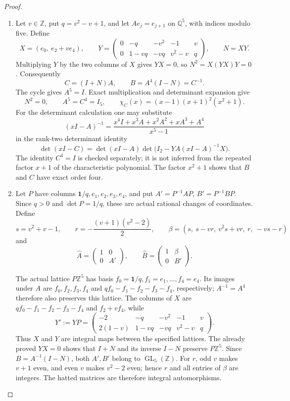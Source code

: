 \documentclass[11pt,a4paper]{article}
\theoremstyle{definition}
\begin{document}
\begin{proof}
\begin{enumerate}[label=\arabic*.]
\item Let $v\in\mathbb Z$, put $q=v^2-v+1$, and let
$Ae_j=e_{j+1}$ on $\mathbb Q^5$, with indices modulo five. Define
\[
 X=(e_0,\ e_2+ve_4),\qquad
 Y=\begin{pmatrix}
 0&-q&-v^2&-1&v\\
 0&1-vq&-vq&v^2-v&q
 \end{pmatrix},\qquad N=XY.
 \tag{F.U1}\label{maps:eq:F.U1}
\]
Multiplying $Y$ by the two columns of $X$ gives $YX=0$, so
$N^2=X(YX)Y=0$. Consequently
\[
 C=(I+N)A,\qquad B=A^4(I-N)=C^{-1}.
\]
The cycle gives $A^5=I$. Exact multiplication and determinant
expansion give
\[
 N^2=0,\qquad A^5=C^4=I_5,\qquad
 \chi_C(x)=(x-1)(x+1)^2(x^2+1).
 \tag{F.U2}\label{maps:eq:F.U2}
\]
For the determinant calculation one may substitute
\[
 (xI-A)^{-1}=
 \frac{x^4I+x^3A+x^2A^2+xA^3+A^4}{x^5-1}
\]
in the rank-two determinant identity
\[
 \det(xI-C)=\det(xI-A)
       \det\bigl(I_2-YA(xI-A)^{-1}X\bigr).
\]
The identity $C^4=I$ is checked separately; it is not inferred
from the repeated factor $x+1$ of the characteristic polynomial.
The factor $x^2+1$ shows that $B$ and $C$ have exact order four.

\item Let $P$ have columns $\mathbf1/q,e_1,e_2,e_3,e_4$, and put
$A'=P^{-1}AP$, $B'=P^{-1}BP$. Since $q>0$ and $\det P=1/q$,
these are actual rational changes of coordinates. Define
\[
 s=v^2+v-1,\qquad r=-\frac{(v+1)(v^2-2)}2,
 \qquad
 \beta=(s,\ s-vr,\ v^2s+vr,\ r,\ -vs-r)
 \tag{F.U3}\label{maps:eq:F.U3}
\]
and
\[
 \widehat A=\begin{pmatrix}1&0\\0&A'\end{pmatrix},\qquad
 \widehat B=\begin{pmatrix}1&\beta\\0&B'\end{pmatrix}.
 \tag{F.U4}\label{maps:eq:F.U4}
\]

The actual lattice $P\mathbb Z^5$ has basis
$f_0=\mathbf1/q,f_1=e_1,\ldots,f_4=e_4$.
Its images under $A$ are $f_0,f_2,f_3,f_4$ and
$qf_0-f_1-f_2-f_3-f_4$, respectively; $A^{-1}=A^4$
therefore also preserves this lattice. The columns of $X$ are
$qf_0-f_1-f_2-f_3-f_4$ and $f_2+vf_4$, while
\[
 Y':=YP=\begin{pmatrix}
 -2&-q&-v^2&-1&v\\
 2(1-v)&1-vq&-vq&v^2-v&q
 \end{pmatrix}.
\]
Thus $X$ and $Y$ are integral maps between the specified lattices.
The already proved $YX=0$ shows that $I+N$ and its inverse $I-N$
preserve $P\mathbb Z^5$. Since $B=A^{-1}(I-N)$, both
$A',B'$ belong to $\operatorname{GL}_5(\mathbb Z)$.
For $r$, odd $v$ makes $v+1$ even, and even $v$ makes
$v^2-2$ even; hence $r$ and all entries of $\beta$ are integers.
The hatted matrices are therefore integral automorphisms.


\end{enumerate}
\end{proof}
\end{document}
